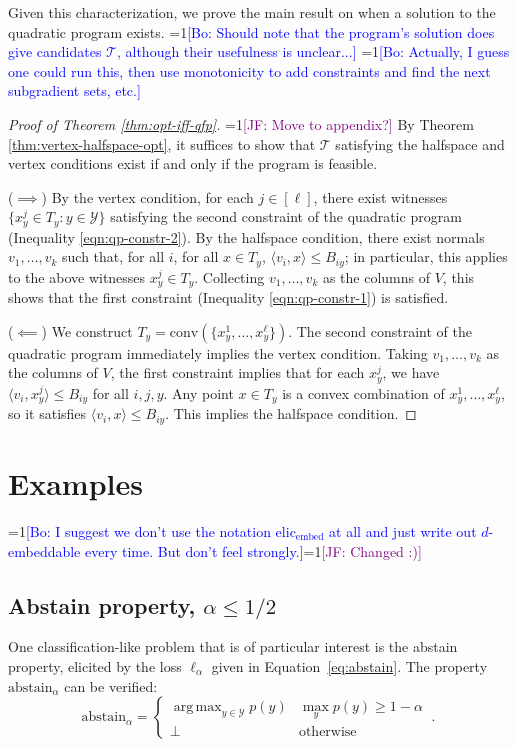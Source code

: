 \documentclass[anon]{colt2020} %
\newcommand{\Comments}{1}
\newcommand{\mynote}[2]{\ifnum\Comments=1\textcolor{#1}{#2}\fi}
\newcommand{\jessie}[1]{\mynote{purple}{[JF: #1]}}
\newcommand{\bo}[1]{\mynote{blue}{[Bo: #1]}}
\newcommand{\elicembed}{\mathrm{elic}_\mathrm{embed}}
\newcommand{\abstain}[1]{\mathrm{abstain}_{#1}}
\newcommand{\T}{\mathcal{T}}
\newcommand{\Y}{\mathcal{Y}}
\newcommand{\ellabs}[1]{\ell_{#1}}
\newcommand{\inprod}[2]{\langle #1, #2 \rangle}%
\newcommand{\conv}{\mathrm{conv}}
\DeclareMathOperator*{\argmax}{arg\,max}
\begin{document}
Given this characterization, we prove the main result on when a solution to the quadratic program exists.
\bo{Should note that the program's solution does give candidates $\T$, although their usefulness is unclear...}
\bo{Actually, I guess one could run this, then use monotonicity to add constraints and find the next subgradient sets, etc.}

\begin{proof}[Proof of Theorem \ref{thm:opt-iff-qfp}]
	\jessie{Move to appendix?}
    By Theorem \ref{thm:vertex-halfspace-opt}, it suffices to show that $\T$ satisfying the halfspace and vertex conditions exist if and only if the program is feasible.

  ($\implies$)
  By the vertex condition, for each $j \in [\ell]$, there exist witnesses $\{x^j_y \in T_y : y \in \Y\}$ satisfying the second constraint of the quadratic program (Inequality \ref{eqn:qp-constr-2}).
  By the halfspace condition, there exist normals $v_1, \dots, v_k$ such that, for all $i$, for all $x \in T_y$, $\inprod{v_i}{x} \leq B_{iy}$; in particular, this applies to the above witnesses $x^j_y \in T_y$.
  Collecting $v_1,\dots,v_k$ as the columns of $V$, this shows that the first constraint (Inequality \ref{eqn:qp-constr-1}) is satisfied.

  \bigskip
  ($\impliedby$)
  We construct $T_y = \conv(\{x^1_y, \ldots, x^{\ell}_y\})$.
  The second constraint of the quadratic program immediately implies the vertex condition.
  Taking $v_1,\dots,v_k$ as the columns of $V$, the first constraint implies that for each $x^j_y$, we have $\inprod{v_i}{x^j_y} \leq B_{iy}$ for all $i,j,y$.
  Any point $x \in T_y$ is a convex combination of $x^1_y,\ldots,x^{\ell}_y$, so it satisfies $\inprod{v_i}{x} \leq B_{iy}$.
  This implies the halfspace condition.  %
\end{proof}




\section{Examples}\label{sec:examples}
\bo{I suggest we don't use the notation $\elicembed$ at all and just write out $d$-embeddable every time. But don't feel strongly.}\jessie{Changed :)}
\subsection{Abstain property, $\alpha \leq 1/2$}\label{subsec:example-abstain}
One classification-like problem that is of particular interest is the abstain property, elicited by the loss $\ellabs{\alpha}$ given in Equation~\ref{eq:abstain}.
The property $\abstain{\alpha}$ can be verified:
\begin{equation}\label{eq:abstain-prop}
     \abstain{\alpha} = \begin{cases}
     \argmax_{y \in \Y} p(y) & \max_y p(y) \geq 1 - \alpha\\
     \bot & \text{otherwise}
     \end{cases}~.~
\end{equation}
\end{document}

